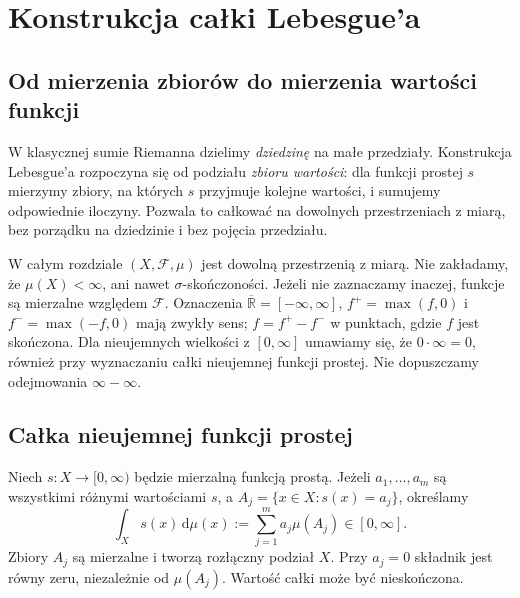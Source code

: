 \chapter{Konstrukcja całki Lebesgue'a}
\label{ch:calkowanie-lebesgue}

\section{Od mierzenia zbiorów do mierzenia wartości funkcji}

W klasycznej sumie Riemanna dzielimy \emph{dziedzinę} na małe
przedziały. Konstrukcja Lebesgue'a rozpoczyna się od podziału
\emph{zbioru wartości}: dla funkcji prostej $s$ mierzymy zbiory,
na których $s$ przyjmuje kolejne wartości, i sumujemy odpowiednie
iloczyny. Pozwala to całkować na dowolnych przestrzeniach z miarą,
bez porządku na dziedzinie i bez pojęcia przedziału.

W całym rozdziale $(X,\mathcal F,\mu)$ jest dowolną przestrzenią
z miarą. Nie zakładamy, że $\mu(X)<\infty$, ani nawet
$\sigma$-skończoności. Jeżeli nie zaznaczamy inaczej,
funkcje są mierzalne względem $\mathcal F$.
Oznaczenia $\overline{\mathbb R}=[-\infty,\infty]$,
$f^+=\max(f,0)$ i $f^-=\max(-f,0)$ mają zwykły sens;
$f=f^+-f^-$ w punktach, gdzie $f$ jest skończona.
Dla nieujemnych wielkości z $[0,\infty]$ umawiamy się,
że $0\cdot\infty=0$, również przy wyznaczaniu całki
nieujemnej funkcji prostej. Nie dopuszczamy odejmowania
$\infty-\infty$.

\section{Całka nieujemnej funkcji prostej}

\begin{definicja}
\label{def:integral-simple}
Niech $s:X\to[0,\infty)$ będzie mierzalną funkcją prostą.
Jeżeli $a_1,\ldots,a_m$ są wszystkimi różnymi wartościami $s$,
a $A_j=\{x\in X:s(x)=a_j\}$, określamy
\begin{equation}\label{eq:simple-integral}
\int_X s(x)\,\mathrm d\mu(x)
:=\sum_{j=1}^{m}a_j\mu(A_j)\in[0,\infty].
\end{equation}
Zbiory $A_j$ są mierzalne i tworzą rozłączny podział $X$.
Przy $a_j=0$ składnik jest równy zeru, niezależnie od
$\mu(A_j)$. Wartość całki może być nieskończona.
\end{definicja}

